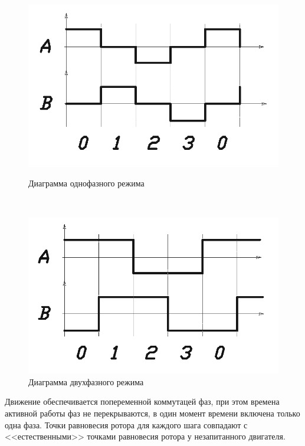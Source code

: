 \begin{figure}
    \centering
    \begin{minipage}{0.45\textwidth}
        \centering
        \includegraphics[width=\linewidth, keepaspectratio]
                        {./src/pictures/control_algo/one_phase_algo}
        \caption{Диаграмма однофазного режима}
        \label{pic_one_phase_algo}
    \end{minipage}~
    \begin{minipage}{0.45\textwidth}
        \centering
        \includegraphics[width=\linewidth, keepaspectratio]
                        {./src/pictures/control_algo/two_phase_algo}
        \caption{Диаграмма двухфазного режима}
        \label{pic_two_phase_algo}
    \end{minipage}
\end{figure}

Движение обеспечивается попеременной коммутацей фаз, при этом времена активной работы фаз
не перекрываются, в один момент времени включена только одна фаза. Точки равновесия
ротора для каждого шага совпадают с <<естественными>> точками равновесия ротора у
незапитанного двигателя.

